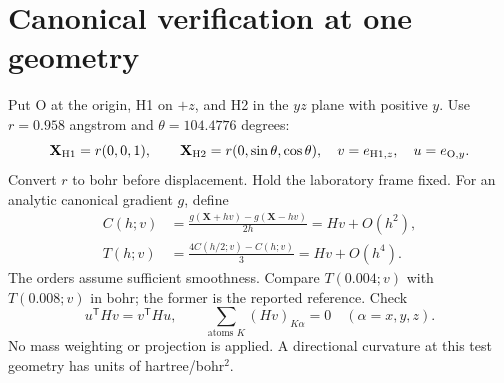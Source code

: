 \documentclass[11pt]{article}
\begin{document}
\section{Canonical verification at one geometry}
Put O at the origin, H1 on $+z$, and H2 in the $yz$ plane with positive $y$.
Use $r=0.958$ angstrom and $\theta=104.4776$ degrees:
\begin{equation}
 \mathbf X_{\rm H1}=r(0,0,1),\qquad
 \mathbf X_{\rm H2}=r(0,\sin\theta,\cos\theta),\quad
 v=e_{{\rm H1},z},\quad u=e_{{\rm O},y}.
\end{equation}
Convert $r$ to bohr before displacement. Hold the laboratory frame fixed.
For an analytic canonical gradient $g$, define
\begin{align}
 C(h;v)&=\frac{g(\mathbf X+h v)-g(\mathbf X-h v)}{2h}
       =Hv+O(h^2),\\
 T(h;v)&=\frac{4C(h/2;v)-C(h;v)}{3}=Hv+O(h^4).
\end{align}
The orders assume sufficient smoothness. Compare $T(0.004;v)$ with
$T(0.008;v)$ in bohr; the former is the reported reference. Check
\begin{equation}
 u^{\mathsf T}Hv=v^{\mathsf T}Hu,\qquad
 \sum_{\text{atoms }K}(Hv)_{K\alpha}=0\quad(\alpha=x,y,z).
\end{equation}
No mass weighting or projection is applied. A directional curvature at
this test geometry has units of hartree/bohr$^2$.
\end{document}
